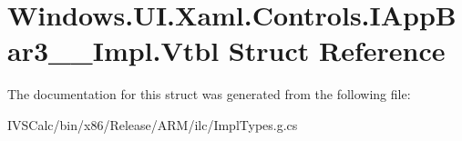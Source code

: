 \hypertarget{struct_windows_1_1_u_i_1_1_xaml_1_1_controls_1_1_i_app_bar3_____impl_1_1_vtbl}{}\section{Windows.\+U\+I.\+Xaml.\+Controls.\+I\+App\+Bar3\+\_\+\+\_\+\+Impl.\+Vtbl Struct Reference}
\label{struct_windows_1_1_u_i_1_1_xaml_1_1_controls_1_1_i_app_bar3_____impl_1_1_vtbl}


The documentation for this struct was generated from the following file\+:\begin{DoxyCompactItemize}
\item 
I\+V\+S\+Calc/bin/x86/\+Release/\+A\+R\+M/ilc/Impl\+Types.\+g.\+cs\end{DoxyCompactItemize}
